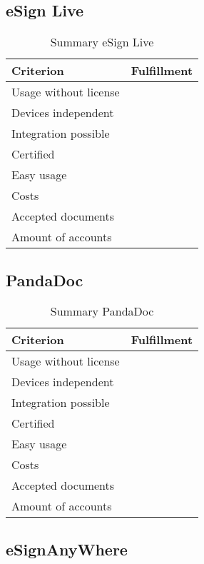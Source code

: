 \subsection{eSign Live}

\begin{table}[h]
	\begin{tabular}{|p{4cm}|p{10cm}|} \hline
		Criterion & Fulfillment \\ \hline
		Usage without license & \\ \hline
		Devices independent & \\ \hline
		Integration possible & \\ \hline
		Certified & \\ \hline
		Easy usage & \\ \hline
		Costs & \\ \hline
		Accepted documents & \\ \hline
		Amount of accounts & \\ \hline
	\end{tabular}
	\caption{Summary eSign Live}
	\label{tab:esign}
\end{table}

\subsection{PandaDoc}

\begin{table}[h]
	\begin{tabular}{|p{4cm}|p{10cm}|} \hline
		Criterion & Fulfillment \\ \hline
		Usage without license & \\ \hline
		Devices independent & \\ \hline
		Integration possible & \\ \hline
		Certified & \\ \hline
		Easy usage & \\ \hline
		Costs & \\ \hline
		Accepted documents & \\ \hline
		Amount of accounts & \\ \hline
	\end{tabular}
	\caption{Summary PandaDoc}
	\label{tab:pandadoc}
\end{table}

\subsection{eSignAnyWhere}

